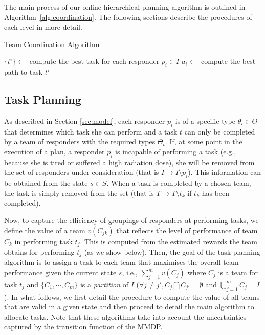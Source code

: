 The main process of our online hierarchical planning algorithm is
outlined in Algorithm~\ref{alg:coordination}. The following
sections describe the procedures of each level in more detail.

\begin{algorithm}[t]
  \caption{Team Coordination Algorithm}\small
  \label{alg:coordination}
  \Indm
  \Indp\BlankLine
  $\{ t^i \} \gets$ compute the best task for each responder $p_i\in I$ \;
   {
    $a_i \gets$ compute the best path to task $t^i$ \;
  }
  \vspace{-1mm}
\end{algorithm}


\subsection{Task Planning}
\label{sec:taskplanning}
\noindent As described in Section \ref{sec:model}, each responder
$p_i$ is of a specific type $\theta_i \in \Theta$ that determines which task
she can perform and  a task $t$ can only be completed by a team of
responders with the required types $\Theta_t$. If, at some point in
the execution of a plan, a responder $p_i$ is incapable of
performing a task (e.g., because she is tired or suffered a high
radiation dose), she will be removed from the set of responders
under consideration (that is $I \to I \setminus p_i$). This
information can be obtained from the state $s \in S$. When a task
is completed by a chosen team, the task is simply removed from the
set (that is $T \to T\setminus t_k$ if $t_k$ has been completed).

Now, to capture the efficiency of groupings of responders at
performing tasks, we define the value
of a team $v(C_{jk})$ that reflects the level of performance of
team $C_k$ in performing task $t_j$. This is computed from the estimated rewards the team obtains for performing $t_j$ (as we show below).  Then, the goal of the task
planning algorithm is to assign a task to each team that maximises
the overall team performance given the current state $s$, i.e.,
$\sum_{j=1}^m v(C_{j})$ where $C_j$ is a team for task $t_j$ and $\{
C_1, \cdots, C_m \}$ is a {\em partition} of $I$ ($\forall j\neq
j', C_j \bigcap C_{j'} = \emptyset$ and $\bigcup_{j=1}^m C_j=I$).
In what follows, we first detail the procedure to compute the value
of all teams that are valid in a given state and then proceed to
detail the main algorithm to allocate tasks. Note that these
algorithms take into account the uncertainties captured by the
transition function of the MMDP.


